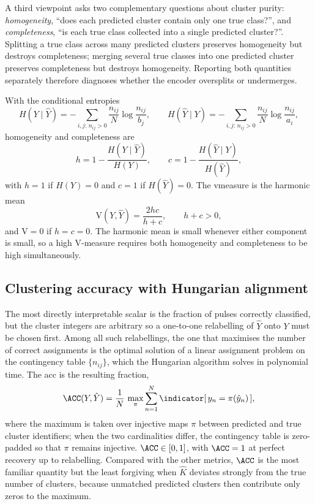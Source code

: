 A third viewpoint asks two complementary questions about cluster purity: \emph{homogeneity}, ``does each predicted cluster contain only one true class?'', and \emph{completeness}, ``is each true class collected into a single predicted cluster?''.
Splitting a true class across many predicted clusters preserves homogeneity but destroys completeness; merging several true classes into one predicted cluster preserves completeness but destroys homogeneity.
Reporting both quantities separately therefore diagnoses whether the encoder oversplits or undermerges.

With the conditional entropies
\begin{equation}\label{eq:method:cond_ent}
  H(Y\mid \hat{Y})=-\sum_{i,j:\,n_{ij}>0}\frac{n_{ij}}{N}\log\frac{n_{ij}}{b_j},
  \qquad
  H(\hat{Y}\mid Y)=-\sum_{i,j:\,n_{ij}>0}\frac{n_{ij}}{N}\log\frac{n_{ij}}{a_i},
\end{equation}
homogeneity and completeness are \parencite{rosenberg2007v}
\begin{equation}\label{eq:method:vmeasure_hc}
  h = 1-\frac{H(Y\mid \hat{Y})}{H(Y)},
  \qquad
  c = 1-\frac{H(\hat{Y}\mid Y)}{H(\hat{Y})},
\end{equation}
with $h=1$ if $H(Y)=0$ and $c=1$ if $H(\hat{Y})=0$.
The \gls{vmeasure} is the harmonic mean
\begin{equation}\label{eq:method:vmeasure}
  \mathrm{V}(Y,\hat{Y})=\frac{2hc}{h+c},
  \qquad h+c>0,
\end{equation}
and $\mathrm{V}=0$ if $h=c=0$.
The harmonic mean is small whenever either component is small, so a high V-measure requires both homogeneity and completeness to be high simultaneously.

\subsection*{Clustering accuracy with Hungarian alignment}

The most directly interpretable scalar is the fraction of pulses correctly classified, but the cluster integers are arbitrary so a one-to-one relabelling of $\hat{Y}$ onto $Y$ must be chosen first.
Among all such relabellings, the one that maximises the number of correct assignments is the optimal solution of a linear assignment problem on the contingency table $\{n_{ij}\}$, which the Hungarian algorithm \parencite{kuhn1955hungarian} solves in polynomial time.
The \gls{acc} is the resulting fraction,
\begin{equation}\label{eq:method:acc}
  \ACC(Y,\hat{Y})
  =
  \frac{1}{N}\,
  \max_{\pi}\sum_{n=1}^{N}
  \indicator[\,y_n=\pi(\hat{y}_n)\,],
\end{equation}
where the maximum is taken over injective maps $\pi$ between predicted and true cluster identifiers; when the two cardinalities differ, the contingency table is zero-padded so that $\pi$ remains injective.
$\ACC\in[0,1]$, with $\ACC=1$ at perfect recovery up to relabelling.
Compared with the other metrics, $\ACC$ is the most familiar quantity but the least forgiving when $\hat{K}$ deviates strongly from the true number of clusters, because unmatched predicted clusters then contribute only zeros to the maximum.


